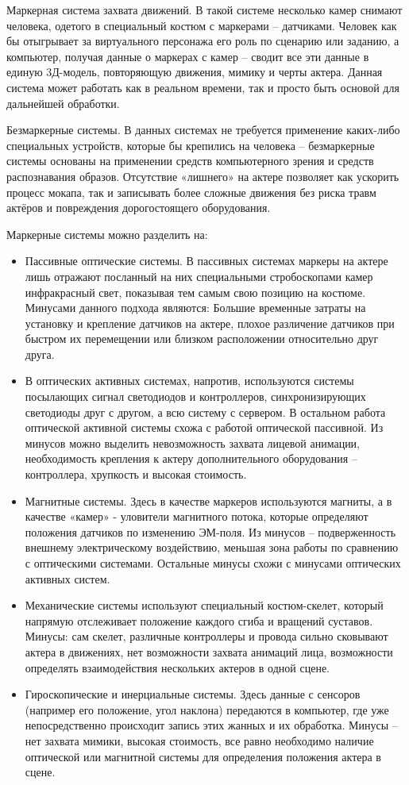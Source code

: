 Маркерная система захвата движений. В такой системе несколько камер снимают человека, одетого в специальный костюм с маркерами – датчиками. Человек как бы отыгрывает за виртуального персонажа его роль по сценарию или заданию, а компьютер, получая данные о маркерах с камер – сводит все эти данные в единую 3Д-модель, повторяющую движения, мимику и черты актера. Данная система может работать как в реальном времени, так и просто быть основой для дальнейшей обработки.

Безмаркерные системы. В данных системах не требуется применение каких-либо специальных устройств, которые бы крепились на человека – безмаркерные системы основаны на применении средств компьютерного зрения и средств распознавания образов. Отсутствие «лишнего» на актере позволяет как ускорить процесс мокапа, так и записывать более сложные движения без риска травм актёров и повреждения дорогостоящего оборудования.

Маркерные системы можно разделить на:
\begin{itemize}
	\item Пассивные оптические системы. В пассивных системах маркеры на актере лишь отражают посланный на них специальными стробоскопами камер инфракрасный свет, показывая тем самым свою позицию на костюме. Минусами данного подхода являются: Большие временные затраты на установку и крепление датчиков на актере, плохое различение датчиков при быстром их перемещении или близком расположении относительно друг друга.
	\item В оптических активных системах, напротив, используются системы посылающих сигнал светодиодов и контроллеров, синхронизирующих светодиоды друг с другом, а всю систему с сервером. В остальном работа оптической активной системы схожа с работой оптической пассивной. Из минусов можно выделить невозможность захвата лицевой анимации, необходимость крепления к актеру дополнительного оборудования – контроллера, хрупкость и высокая стоимость.
	\item Магнитные системы. Здесь в качестве маркеров используются магниты, а в качестве «камер» - уловители магнитного потока, которые определяют положения датчиков по изменению ЭМ-поля. Из минусов – подверженность внешнему электрическому воздействию, меньшая зона работы по сравнению с оптическими системами. Остальные минусы схожи с минусами оптических активных систем.
	\item Механические системы используют специальный костюм-скелет, который напрямую отслеживает положение каждого сгиба и вращений суставов. Минусы: сам скелет, различные контроллеры и провода сильно сковывают актера в движениях, нет возможности захвата анимаций лица, возможности определять взаимодействия нескольких актеров в одной сцене.
	\item Гироскопические и инерциальные системы. Здесь данные с сенсоров (например его положение, угол наклона) передаются в компьютер, где уже непосредственно происходит запись этих жанных и их обработка. Минусы – нет захвата мимики, высокая стоимость, все равно необходимо наличие оптической или магнитной системы для определения положения актера в сцене.
\end{itemize}

